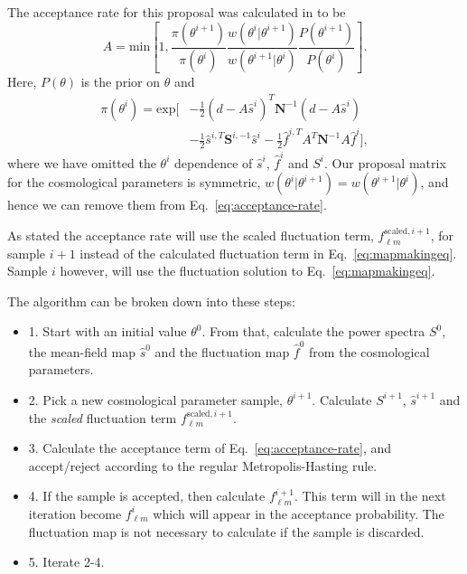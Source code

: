 \documentclass[twocolumn]{../common/aa}
\begin{document}
The acceptance rate for this proposal was calculated in \cite{racine:2016} to be
\begin{equation}
    \label{eq:acceptance-rate}
    A = \mathrm{min}\left[1, \frac{\pi(\theta^{i+1})}{\pi(\theta^i)} \frac{w(\theta^{i} |\theta^{i+1})}{w(\theta^{i+1} |\theta^i) }\frac{P(\theta^{i+1})}{P(\theta^i)} \right].
\end{equation}
Here, $P(\theta)$ is the prior on $\theta$ and
\begin{align}
    \nonumber
    \pi(\theta^{i}) = \mathrm{exp}\bigg[&-\frac12 \left(d-A\hat{s}^i\right)^T \textbf{N}^{-1}\left(d-A\hat{s}^i\right)\\
    &-\frac12 \hat{s}^{i,T} \textbf{S}^{i, -1}\hat{s}^i -\frac12 \hat{f}^{i, T}A^T\textbf{N}^{-1} A\hat{f}^i\bigg],
\end{align}
where we have omitted the $\theta^i$ dependence of $\hat{s}^i$, $\hat{f}^i$ and $S^i$. Our proposal matrix for the cosmological parameters is symmetric, $w(\theta^{i} |\theta^{i+1}) = w(\theta^{i+1} |\theta^{i})$, and hence we can remove them from Eq.~\eqref{eq:acceptance-rate}.

As stated the acceptance rate will use the scaled fluctuation term, $f_{\ell m}^{\textrm{scaled}, i+1}$, for sample $i+1$ instead of the calculated fluctuation term in Eq.~\eqref{eq:mapmakingeq}. Sample $i$ however, will use the fluctuation solution to Eq.~\eqref{eq:mapmakingeq}.

The algorithm can be broken down into these steps:
\begin{itemize}
    \item 1. Start with an initial value $\theta^0$. From that, calculate the power spectra $S^0$, the mean-field map $\hat{s}^0$ and the fluctuation map $\hat{f}^0$ from the cosmological parameters.
    \item 2. Pick a new cosmological parameter sample, $\theta^{i+1}$. Calculate $S^{i+1}$, $\hat{s}^{i+1}$ and the \textit{scaled} fluctuation term $f_{\ell m}^{\textrm{scaled}, i+1}$.
    \item 3. Calculate the acceptance term of Eq.~\ref{eq:acceptance-rate}, and accept/reject according to the regular Metropolis-Hasting rule.
    \item 4. If the sample is accepted, then calculate $f_{\ell m}^{i+1}$. This term will in the next iteration become $f_{\ell m}^{i}$ which will appear in the acceptance probability. The fluctuation map is not necessary to calculate if the sample is discarded.
    \item 5. Iterate 2-4.
\end{itemize}
\end{document}
